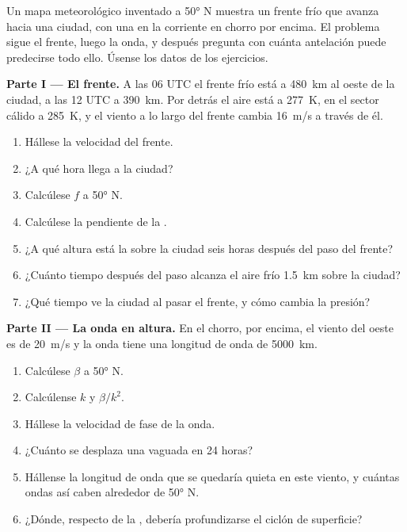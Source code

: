 \begin{problem}\label{pb:b2:weather-systems:1}
Un mapa meteorológico inventado a \ang{50} N muestra un frente frío que avanza hacia una ciudad, con una  en la corriente en chorro por encima. El problema sigue el frente, luego la onda, y después pregunta con cuánta
antelación puede predecirse todo ello. Úsense los datos de los ejercicios.

\medskip\noindent\textbf{Parte I --- El frente.}
A las 06 UTC el frente frío está a \qty{480}{km} al oeste de la ciudad, a las 12 UTC a \qty{390}{km}. Por detrás
el aire está a \qty{277}{K}, en el sector cálido a \qty{285}{K}, y el viento a lo largo del frente
cambia \qty{16}{m/s} a través de él.
\begin{enumerate}
  \item Hállese la velocidad del frente.
  \item ¿A qué hora llega a la ciudad?
  \item Calcúlese $f$ a \ang{50} N.
  \item Calcúlese la pendiente de la .
  \item ¿A qué altura está la  sobre la ciudad seis horas después del paso del frente?
  \item ¿Cuánto tiempo después del paso alcanza el aire frío \qty{1.5}{km} sobre la ciudad?
  \item ¿Qué tiempo ve la ciudad al pasar el frente, y cómo cambia la presión?
\end{enumerate}

\medskip\noindent\textbf{Parte II --- La onda en altura.}
En el chorro, por encima, el viento del oeste es de \qty{20}{m/s} y la onda tiene una longitud de onda de \qty{5000}{km}.
\begin{enumerate}[resume]
  \item Calcúlese $\beta$ a \ang{50} N.
  \item Calcúlense $k$ y $\beta/k^2$.
  \item Hállese la velocidad de fase de la onda.
  \item ¿Cuánto se desplaza una vaguada en 24 horas?
  \item Hállense la longitud de onda que se quedaría quieta en este viento, y cuántas ondas así caben
        alrededor de \ang{50} N.
  \item ¿Dónde, respecto de la , debería profundizarse el ciclón de superficie?
\end{enumerate}


\end{problem}
